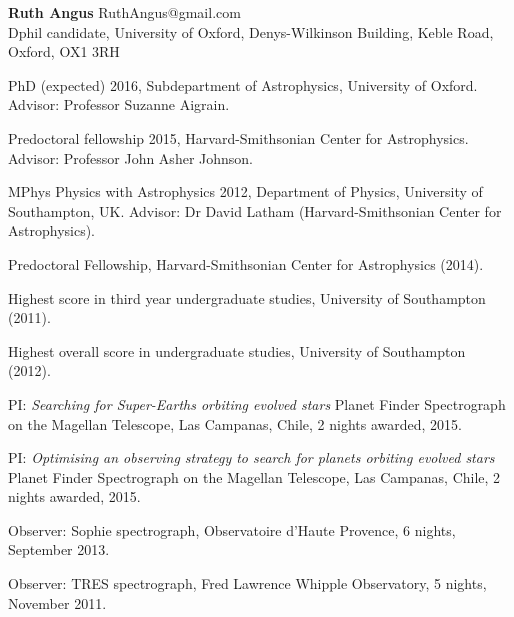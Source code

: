 \documentclass[12pt,letterpaper]{article}
\begin{document}
\thispagestyle{empty}\sloppy\sloppypar\raggedbottom

\textbf{\Large Ruth Angus} \hfill
\textsf{\small RuthAngus@gmail.com} \\[0.5ex]
Dphil candidate, University of Oxford, Denys-Wilkinson Building, Keble Road,
Oxford, OX1 3RH\\[0.5ex]

\begin{list}{}{\cvlist}
\item
PhD (expected) 2016, Subdepartment of Astrophysics, University of Oxford.
Advisor: Professor Suzanne Aigrain.
\item
Predoctoral fellowship 2015, Harvard-Smithsonian Center for Astrophysics.
Advisor: Professor John Asher Johnson.
\item
MPhys Physics with Astrophysics 2012, Department of Physics, University of
Southampton, UK. Advisor: Dr David Latham (Harvard-Smithsonian Center for
Astrophysics).
\end{list}

\begin{list}{}{\cvlist}
\item
Predoctoral Fellowship, Harvard-Smithsonian Center for Astrophysics (2014).
\item
Highest score in third year undergraduate studies, University of Southampton
(2011).
\item
Highest overall score in undergraduate studies, University of Southampton
(2012).
\end{list}

\begin{list}{}{\cvlist}
\item
PI: {\it Searching for Super-Earths orbiting evolved stars} Planet Finder
Spectrograph on the Magellan Telescope, Las Campanas, Chile, 2 nights awarded,
2015.
\item
PI: {\it Optimising an observing strategy to search for planets orbiting
evolved stars} Planet Finder Spectrograph on the Magellan Telescope, Las
Campanas, Chile, 2 nights awarded, 2015.
\item
Observer: Sophie spectrograph, Observatoire d'Haute Provence, 6 nights,
September 2013.
\item
Observer: TRES spectrograph, Fred Lawrence Whipple Observatory, 5 nights,
November 2011.
\end{list}
\end{document}
